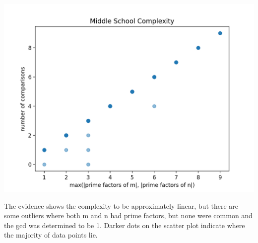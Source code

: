 \documentclass{report}
\begin{document}
\begin{flushleft}
		\includegraphics{task3}

		The evidence shows the complexity to be approximately linear, but there are some outliers where 
		both m and n had prime factors, but none were common and the gcd was determined to be 1. Darker dots on the
		scatter plot indicate where the majority of data points lie.

	\end{flushleft}
\end{document}
